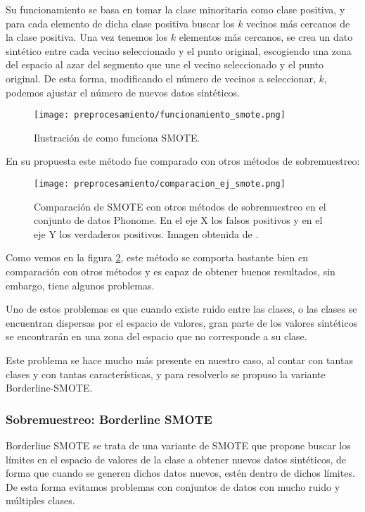 Su funcionamiento se basa en tomar la clase minoritaria como clase positiva, y para cada elemento de dicha clase positiva buscar los $k$ vecinos más cercanos de la clase positiva. Una vez tenemos los $k$ elementos más cercanos, se crea un dato sintético entre cada vecino seleccionado y el punto original, escogiendo una zona del espacio al azar del segmento que une el vecino seleccionado y el punto original. De esta forma, modificando el número de vecinos a seleccionar, $k$, podemos ajustar el número de nuevos datos sintéticos.

\begin{figure}[H]
	\centering
	\texttt{[image: preprocesamiento/funcionamiento\_smote.png]}
	\caption{Ilustración de como funciona SMOTE.}
	\label{fig:funcionamiento_smote}
\end{figure}

\newpage

En su propuesta este método fue comparado con otros métodos de sobremuestreo:

\begin{figure}[H]
	\centering
	\texttt{[image: preprocesamiento/comparacion\_ej\_smote.png]}
	\caption{Comparación de SMOTE con otros métodos de sobremuestreo en el conjunto de datos Phonome. En el eje X los falsos positivos y en el eje Y los verdaderos positivos. Imagen obtenida de \cite{SMOTE}.}
	\label{fig:comparacionSMOTE}
\end{figure}

Como vemos en la figura \ref{fig:comparacionSMOTE}, este método se comporta bastante bien en comparación con otros métodos y es capaz de obtener buenos resultados, sin embargo, tiene algunos problemas.

Uno de estos problemas es que cuando existe ruido entre las clases, o las clases se encuentran dispersas por el espacio de valores, gran parte de los valores sintéticos se encontrarán en una zona del espacio que no corresponde a su clase.

Este problema se hace mucho más presente en nuestro caso, al contar con tantas clases y con tantas características, y para resolverlo se propuso la variante Borderline-SMOTE.

\subsubsection{Sobremuestreo: Borderline SMOTE}

Borderline SMOTE \cite{BL-SMOTE} se trata de una variante de SMOTE que propone buscar los límites en el espacio de valores de la clase a obtener nuevos datos sintéticos, de forma que cuando se generen dichos datos nuevos, estén dentro de dichos límites. De esta forma evitamos problemas con conjuntos de datos con mucho ruido y múltiples clases.

